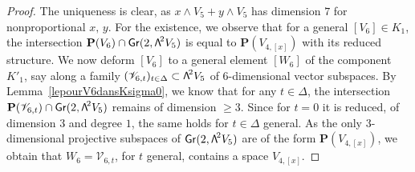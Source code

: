 \documentclass[11pt]{article}
\let\mathcal\mathscr
\theoremstyle{definition}
\renewcommand\P{{\mathbf P}}\let\PP\P
\newcommand\cV{\mathcal{V}}
\DeclareMathOperator{\Gr}{\mathsf{Gr}}
\newcommand\bw[1]{{\hbox{\large$\mathsf{\Lambda}$}^{\!#1}}}
\begin{document}
\begin{proof} The uniqueness is clear, as $x\wedge V_5+y\wedge V_5$ has dimension $7$
for nonproportional $x,\,y$. For the existence, we observe that for a general $[V_6]\in K_1$, the intersection $\P(V_6)\cap \Gr(2, \bw2V_5)$ is equal to
$\P(V_{4,[x]})$ with its reduced structure.
We now deform $[V_6]$ to a general element $[W_6]$ of the component $K'_1$, say along
a family $(\cV _{6,t})_{t\in \Delta}\subset \bw2V_5$ of
$6$-dimensional vector subspaces.
By Lemma~\ref{lepourV6dansKsigma0},
we know that for any $t\in \Delta$, the intersection $\P(\cV _{6,t})\cap \Gr(2, \bw2V_5)$ remains of dimension $\geq3$. Since for $t=0$ it is reduced, of dimension $3$ and degree $1$,
the same holds for $t\in \Delta$ general. As the only $3$-dimensional projective subspaces
of $\Gr(2, \bw2V_5)$ are of the form $\P(V_{4,[x]})$, we obtain that $W_6=\cV _{6,t}$, for $t$ general, contains a space $V_{4,[x]}$.
\end{proof}
\end{document}
